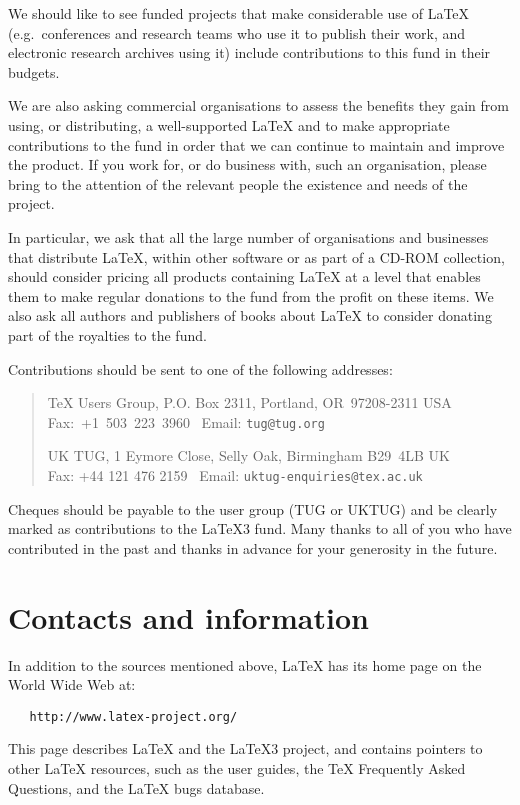 \documentclass[a4paper]{article}
\newcommand{\eg}{e.g.~}
\begin{document}
We should like to see funded projects that make considerable use of
\LaTeX{} (\eg conferences and research teams who use it to publish
their work, and electronic research archives using it) include
contributions to this fund in their budgets.  %

We are also asking commercial organisations to assess the benefits
they gain from using, or distributing, a well-supported \LaTeX{} and
to make appropriate contributions to the fund in order that we can
continue to maintain and improve the product.  If you work for, or do
business with, such an organisation, please bring to the attention of
the relevant people the existence and needs of the project.

In particular, we ask that all the large number of organisations and
businesses that distribute \LaTeX{}, within other software or as part
of a CD-ROM collection, should consider pricing all products containing
\LaTeX{} at a level that enables them to make regular donations to the
fund from the profit on these items.  We also ask all authors and
publishers of books about \LaTeX{} to consider donating part of the
royalties to the fund.

Contributions should be sent to one of the following addresses:
\begin{quote}\small\label{addrs}
   \TeX{} Users Group, P.O. Box 2311, Portland, OR~97208-2311 USA\\
   Fax:~+1~503~223~3960 \ Email: \texttt{tug@tug.org}
   
 \noindent
   UK TUG, 1 Eymore Close, Selly Oak, Birmingham B29~4LB UK\\
   Fax: +44 121 476 2159 \ Email: \texttt{uktug-enquiries@tex.ac.uk}
\end{quote}

Cheques should be payable to the user group (TUG or UKTUG) and be
clearly marked as contributions to the \LaTeX3 fund.
Many thanks to all of you who have contributed in the past and thanks
in advance for your generosity in the future.

\section{Contacts and information}
\label{contacts}

In addition to the sources mentioned above, \LaTeX{} has its home page
on the World Wide Web at:
\begin{verbatim}
   http://www.latex-project.org/
\end{verbatim}
This page describes \LaTeX{} and the \LaTeX3 project, and contains
pointers to other \LaTeX{} resources, such as the user guides, the
\TeX{} Frequently Asked Questions, and the \LaTeX{} bugs database.
\end{document}
